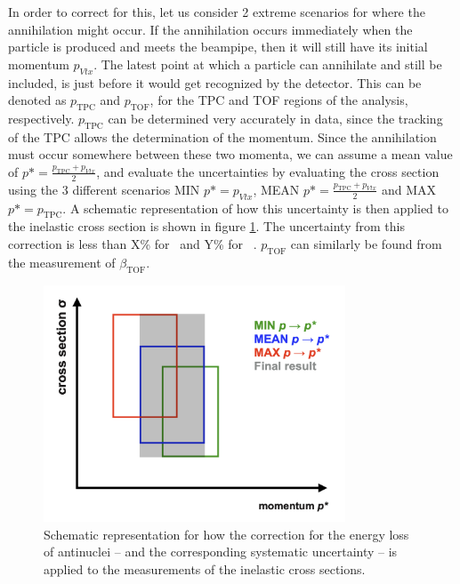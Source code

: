 In order to correct for this, let us consider 2 extreme scenarios for where the annihilation might occur. If the annihilation occurs immediately when the particle is produced and meets the beampipe, then it will still have its initial momentum $p_{Vtx}$. The latest point at which a particle can annihilate and still be included, is just before it would get recognized by the detector. This can be denoted as $p_{\mathrm{TPC}}$ and $p_{\mathrm{TOF}}$, for the TPC and TOF regions of the analysis, respectively. $p_{\mathrm{TPC}}$ can be determined very accurately in data, since the tracking of the TPC allows the determination of the momentum. Since the annihilation must occur somewhere between these two momenta, we can assume a mean value of $p* = \frac{p_{\mathrm{TPC}} + p_{Vtx}}{2}$, and evaluate the uncertainties by evaluating the cross section using the 3 different scenarios MIN $p*=p_{Vtx}$, MEAN $p* = \frac{p_{\mathrm{TPC}} + p_{Vtx}}{2}$ and MAX $p* = p_{\mathrm{TPC}}$. A schematic representation of how this uncertainty is then applied to the inelastic cross section is shown in figure \ref{fig:Eloss_schematic}. The uncertainty from this correction is less than X\% for \ahe\ and Y\% for \atrit\ . $p_{\mathrm{TOF}}$ can similarly be found from the measurement of $\beta_{\mathrm{TOF}}$. 

\begin{figure}
    \centering
    \includegraphics[width=0.8\textwidth]{figures/Eloss_corr_schematic.png}
    \caption{Schematic representation for how the correction for the energy loss of antinuclei -- and the corresponding systematic uncertainty -- is applied to the measurements of the inelastic cross sections.}
    \label{fig:Eloss_schematic}
\end{figure}





